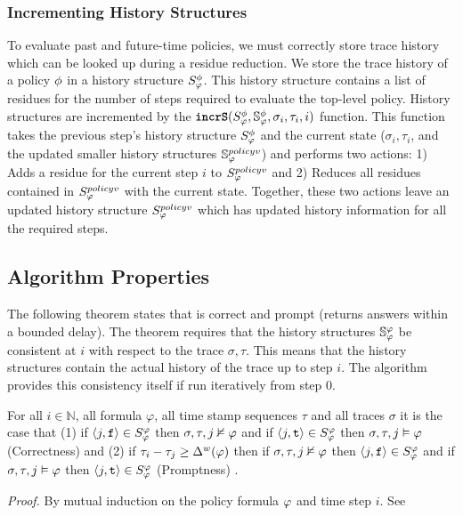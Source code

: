 \subsubsection{Incrementing History Structures}
To evaluate past and future-time policies, we must correctly store trace history which can be looked up during a residue reduction. We store the trace history of a policy $\policyv$ in a history structure $\histst[\policyv]{}$. This history structure contains a list of residues for the number of steps required to evaluate the top-level policy. History structures are incremented by the $\incrS(\histst[\policyv]{i-1}, \histSt[\policyv]{i}, \sigma_i, \tau_i, i)$ function. This function takes the previous step's history structure $\histst[\policyv]{i-1}$ and the current state ($\sigma_i,\tau_i$, and the updated smaller history structures $\histSt[policyv]{i}$) and performs two actions:
	1) Adds a residue for the current step $i$ to $\histst[policyv]{i-1}$ and
	2) Reduces all residues contained in $\histst[policyv]{i-1}$ with the current state.
Together, these two actions leave an updated history structure $\histst[policyv]{i}$ which has updated history information for all the required steps.

\subsection{Algorithm Properties}

The following theorem states that \monitor is correct and prompt (returns answers within a bounded delay). The theorem requires that the history structures $\histSt{i}$ be consistent at $i$ with respect to the trace $\sigma,\tau$. This means that the history structures contain the actual history of the trace up to step $i$. The algorithm provides this consistency itself if run iteratively from step $0$.

\begin{theorem}
For all $i \in \mathbb{N}$, all formula $\varphi$, all time stamp sequences $\tau$ and all traces $\sigma$ it is the case that (1) if $\rp{j}{\false} \in \histst{i}$ then $\sigma, \tau, j \nvDash \policy$ and if $\rp{j}{\true} \in \histst{i}$ then $\sigma, \tau, j \vDash \policy$ (Correctness) and (2) if $\tau_i - \tau_j \geq \wdelay(\policy)$ then if $\sigma, \tau, j \nvDash \policy$ then $\rp{j}{\false} \in \histst{i}$ and if $\sigma, \tau, j \vDash \policy$ then $\rp{j}{\true} \in \histst{i}$ (Promptness)
.
\end{theorem}
\textit{Proof.} By mutual induction on the policy formula $\policy$ and time step $i$. See \cite{TechPaper}

